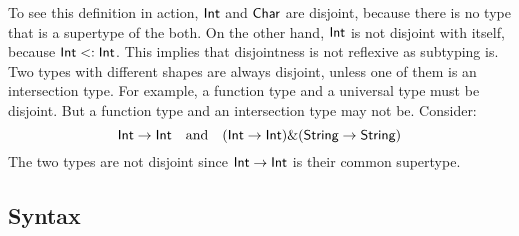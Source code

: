 
To see this definition in action, $\textsf{Int}$ and $\textsf{Char}$ are disjoint, 
because there is
no type that is a supertype of the both. On the other hand, $\textsf{Int}$ is not
disjoint with itself, because $\textsf{Int} <: \textsf{Int}$. This implies that
disjointness is not reflexive as subtyping is. Two types with different shapes
are always disjoint, unless one of them is an intersection type. For example, a function
type and a universal type must be disjoint. But a function type and an intersection
type may not be. Consider:
\[ \textsf{Int} \to \textsf{Int} \quad \text{and} \quad (\textsf{Int} \to \textsf{Int}) \& (\textsf{String} \to \textsf{String}) \]
The two types are not disjoint since $\textsf{Int} \to \textsf{Int}$ is their common supertype.



\subsection{Syntax}

